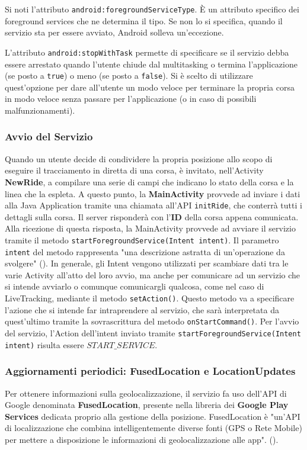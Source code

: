                     Si noti l'attributo \texttt{android:foregroundServiceType}. È un attributo specifico dei foreground services che ne determina il tipo. Se non lo si specifica, quando il servizio sta per essere avviato, Android solleva un'eccezione.

                    L'attributo \texttt{android:stopWithTask} permette di specificare se il servizio debba essere arrestato quando l'utente chiude dal multitasking o termina l'applicazione (se posto a \texttt{true}) o meno (se posto a \texttt{false}). Si è scelto di utilizzare quest'opzione per dare all'utente un modo veloce per terminare la propria corsa in modo veloce senza passare per l'applicazione (o in caso di possibili malfunzionamenti).


                    \subsubsection{Avvio del Servizio}
                        Quando un utente decide di condividere la propria posizione allo scopo di eseguire il tracciamento in diretta di una corsa, è invitato, nell'Activity \textbf{NewRide}, a compilare una serie di campi che indicano lo stato della corsa e la linea che la espleta. A questo punto, la \textbf{MainActivity} provvede ad inviare i dati alla Java Application tramite una chiamata all'API \texttt{initRide}, che conterrà tutti i dettagli sulla corsa. Il server risponderà con l'\textbf{ID} della corsa appena comunicata. Alla ricezione di questa risposta, la MainActivity provvede ad avviare il servizio tramite il metodo \texttt{startForegroundService(Intent intent)}. Il parametro \texttt{intent} del metodo rappresenta "una descrizione astratta di un'operazione da svolgere" (\cite{AndroidIntent}). In generale, gli Intent vengono utilizzati per scambiare dati tra le varie Activity all'atto del loro avvio, ma anche per comunicare ad un servizio che si intende avviarlo o comunque comunicargli qualcosa, come nel caso di LiveTracking, mediante il metodo \texttt{setAction()}. Questo metodo va a specificare l'azione che si intende far intraprendere al servizio, che sarà interpretata da quest'ultimo tramite la sovrascrittura del metodo \texttt{onStartCommand()}. Per l'avvio del servizio, l'Action dell'intent inviato tramite \texttt{startForegroundService(Intent intent)} risulta essere  
                        \texttt{$START\_SERVICE$}.
                    \subsubsection{Aggiornamenti periodici: FusedLocation e LocationUpdates}
                        Per ottenere informazioni sulla geolocalizzazione, il servizio fa uso dell'API di Google denominata \textbf{FusedLocation}, presente nella libreria dei \textbf{Google Play Services} dedicata proprio alla gestione della posizione.
                        FusedLocation è "un'API di localizzazione che combina intelligentemente diverse fonti (GPS o Rete Mobile) per mettere a disposizione le informazioni di geolocalizzazione alle app". (\cite{PlayServicesFusedLocation}).

